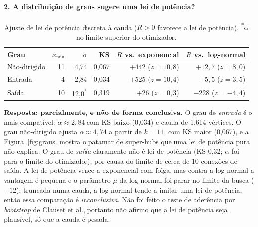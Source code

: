 \documentclass[10pt,a4paper,twocolumn]{article}
\begin{document}
\paragraph{2. A distribuição de graus sugere uma lei de potência?}
\begin{table}[t]\centering\footnotesize
\caption{Ajuste de lei de potência discreta à cauda ($R>0$ favorece a lei de potência). \textsuperscript{*}$\alpha$ no limite superior do otimizador.}\label{tab:pl}
\begin{tabular}{lrrrrr}\toprule
Grau & $x_{\min}$ & $\alpha$ & KS & $R$ vs.\ exponencial & $R$ vs.\ log-normal \\\midrule
Não-dirigido & 11 & 4,74 & 0,067 & $+442$ ($z=10{,}8$) & $+12{,}7$ ($z=8{,}0$) \\
Entrada & 4 & 2,84 & 0,034 & $+525$ ($z=10{,}4$) & $+5{,}5$ ($z=3{,}5$) \\
Saída & 10 & 12,0\textsuperscript{*} & 0,319 & $+26$ ($z=0{,}3$) & $-228$ ($z=-4{,}4$) \\\bottomrule
\end{tabular}
\end{table}
\noindent\textbf{Resposta: parcialmente, e não de forma conclusiva.} O grau de \emph{entrada} é o mais compatível: $\alpha\approx2{,}84$ com KS baixo (0,034) e cauda de 1.614 vértices. O grau não-dirigido ajusta $\alpha\approx4{,}74$ a partir de $k=11$, com KS maior (0,067), e a Figura~\ref{fig:graus} mostra o patamar de super-hubs que uma lei de potência pura não explica. O grau de \emph{saída} claramente não é lei de potência (KS 0,32; $\alpha$ foi para o limite do otimizador), por causa do limite de cerca de 10 conexões de saída. A lei de potência vence a exponencial com folga, mas contra a log-normal a vantagem é pequena e o parâmetro $\mu$ da log-normal foi parar no limite da busca ($-12$): truncada numa cauda, a log-normal tende a imitar uma lei de potência, então essa comparação é \emph{inconclusiva}. Não foi feito o teste de aderência por \emph{bootstrap} de Clauset et al., portanto não afirmo que a lei de potência seja plausível, só que a cauda é pesada.
\end{document}
